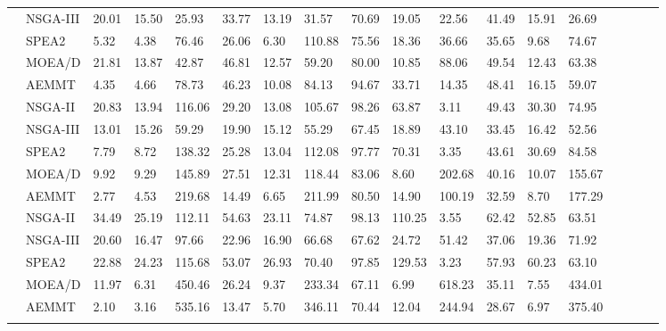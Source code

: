 \begin{sidewaystable}[]
\begin{tabular}{clV{5}l|l|lV{5}l|l|lV{5}l|l|lV{5}l|l|l|}
		 & NSGA-III & 20.01 & 15.50 & 25.93 & 33.77 & 13.19 & 31.57 & 70.69 & 19.05 & 22.56 & 41.49 & 15.91 & 26.69\\ 
		 & SPEA2 & 5.32 & 4.38 & 76.46 & 26.06 & 6.30 & 110.88 & 75.56 & 18.36 & 36.66 & 35.65 & 9.68 & 74.67\\ 
		 & MOEA/D & 21.81 & 13.87 & 42.87 & 46.81 & 12.57 & 59.20 & 80.00 & 10.85 & 88.06 & 49.54 & 12.43 & 63.38\\ 
		 & AEMMT & 4.35 & 4.66 & 78.73 & 46.23 & 10.08 & 84.13 & 94.67 & 33.71 & 14.35 & 48.41 & 16.15 & 59.07\\ 
		 & NSGA-II & 20.83 & 13.94 & 116.06 & 29.20 & 13.08 & 105.67 & 98.26 & 63.87 & 3.11 & 49.43 & 30.30 & 74.95\\ 
		 & NSGA-III & 13.01 & 15.26 & 59.29 & 19.90 & 15.12 & 55.29 & 67.45 & 18.89 & 43.10 & 33.45 & 16.42 & 52.56\\ 
		 & SPEA2 & 7.79 & 8.72 & 138.32 & 25.28 & 13.04 & 112.08 & 97.77 & 70.31 & 3.35 & 43.61 & 30.69 & 84.58\\ 
		 & MOEA/D & 9.92 & 9.29 & 145.89 & 27.51 & 12.31 & 118.44 & 83.06 & 8.60 & 202.68 & 40.16 & 10.07 & 155.67\\ 
		 & AEMMT & 2.77 & 4.53 & 219.68 & 14.49 & 6.65 & 211.99 & 80.50 & 14.90 & 100.19 & 32.59 & 8.70 & 177.29\\ 
		 & NSGA-II & 34.49 & 25.19 & 112.11 & 54.63 & 23.11 & 74.87 & 98.13 & 110.25 & 3.55 & 62.42 & 52.85 & 63.51\\ 
		 & NSGA-III & 20.60 & 16.47 & 97.66 & 22.96 & 16.90 & 66.68 & 67.62 & 24.72 & 51.42 & 37.06 & 19.36 & 71.92\\ 
		 & SPEA2 & 22.88 & 24.23 & 115.68 & 53.07 & 26.93 & 70.40 & 97.85 & 129.53 & 3.23 & 57.93 & 60.23 & 63.10\\ 
		 & MOEA/D & 11.97 & 6.31 & 450.46 & 26.24 & 9.37 & 233.34 & 67.11 & 6.99 & 618.23 & 35.11 & 7.55 & 434.01\\ 
		 & AEMMT & 2.10 & 3.16 & 535.16 & 13.47 & 5.70 & 346.11 & 70.44 & 12.04 & 244.94 & 28.67 & 6.97 & 375.40\\ 

\end{tabular}
\end{sidewaystable}
